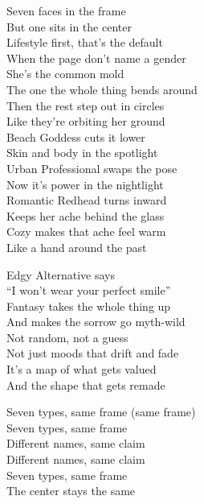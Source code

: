 \begin{lyrics}
Seven faces in the frame\\
But one sits in the center\\
Lifestyle first, that’s the default\\
When the page don’t name a gender\\
She’s the common mold\\
The one the whole thing bends around\\
Then the rest step out in circles\\
Like they’re orbiting her ground\\
Beach Goddess cuts it lower\\
Skin and body in the spotlight\\
Urban Professional swaps the pose\\
Now it’s power in the nightlight\\
Romantic Redhead turns inward\\
Keeps her ache behind the glass\\
Cozy makes that ache feel warm\\
Like a hand around the past

Edgy Alternative says\\
“I won’t wear your perfect smile”\\
Fantasy takes the whole thing up\\
And makes the sorrow go myth-wild\\
Not random, not a guess\\
Not just moods that drift and fade\\
It’s a map of what gets valued\\
And the shape that gets remade

Seven types, same frame (same frame)\\
Seven types, same frame\\
Different names, same claim\\
Different names, same claim\\
Seven types, same frame\\
The center stays the same


\end{lyrics}
